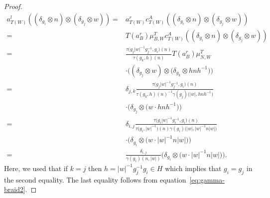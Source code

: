 \documentclass[pdftex]{sigma}
\numberwithin{equation}{section}
\begin{document}
\begin{proof}
\begin{align*}
a^l_{T(W)}((\delta_{g_i}\otimes n)\otimes (\delta_{g_j}\otimes w))={}&a^r_{T(W)}c^{A}_{T(W)}((\delta_{g_i}\otimes n)\otimes (\delta_{g_j}\otimes w))\\
={}&T(a^r_B)\mu^T_{B,W} c^A_{T(W)}((\delta_{g_i}\otimes n)\otimes (\delta_{g_j}\otimes w))\\
={}&\frac{\tau\big(g_j|w|^{-1}g_j^{-1},g_i\big)(n)}{\tau(g_k,h)(n)}T(a_B^r)\mu^T_{N,W}\\
&\cdot \big((\delta_{g_j}\otimes w)\otimes \big(\delta_{g_k}\otimes hnh^{-1}\big)\big)\\
 ={}&\delta_{j,k}\frac{\tau\big(g_j|w|^{-1}g_j^{-1},g_i\big)(n)}{\tau(g_k,h)(n)^{-1}\gamma(g_j)\big(|w|,hnh^{-1}\big)}\\
 &\cdot \big(\delta_{g_j}\otimes \big(w\cdot hnh^{-1}\big)\big)\\
 ={}&\delta_{i,j}\frac{\tau\big(g_i|w|^{-1}g_i^{-1},g_i\big)(n)}{\tau\big(g_i,|w|^{-1}\big)(n)\gamma(g_i)\big(|w|,|w|^{-1}n|w|\big)}\\
 &\cdot \big(\delta_{g_i}\otimes \big(w\cdot|w|^{-1}n|w|\big)\big)\\
 ={}&\frac{\delta_{i,j}}{\gamma(g_i)(n,|w|)}\big(\delta_{g_i}\otimes \big(w\cdot|w|^{-1}n|w|\big)\big).
\end{align*}
Here, we used that if $k=j$ then $h=|w|^{-1}g_j^{-1}g_i\in H$ which implies that $g_i=g_j$ in the second equality. The last equality follows from equation~\eqref{eq:gamma-braid2}.


\end{proof}
\end{document}
